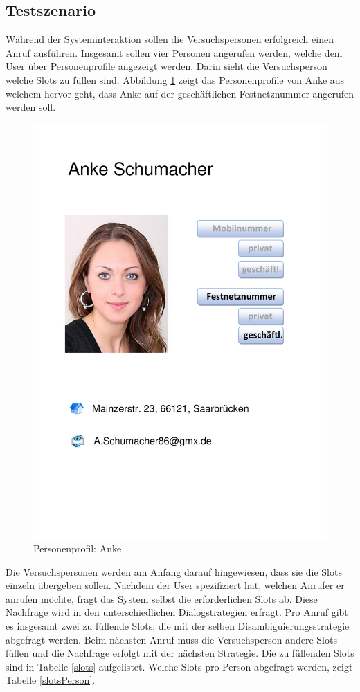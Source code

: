 \documentclass[12pt,a4paper]{scrartcl}
\begin{document}
\subsection{Testszenario}
\label{testszenario1}
Während der Systeminteraktion sollen die Versuchspersonen erfolgreich einen Anruf ausführen. Insgesamt sollen vier Personen angerufen werden, welche dem User über Personenprofile angezeigt werden.  Darin sieht die Versuchsperson welche Slots zu füllen sind. Abbildung \ref{anke} zeigt das Personenprofile von Anke aus welchem hervor geht, dass Anke auf der geschäftlichen Festnetznummer angerufen werden soll. 
\begin{figure}[htbp]
\begin{center}
\includegraphics[width=12cm]{Anke.pdf}
\caption{Personenprofil: Anke}
\label{anke}
\end{center}
\end{figure}
Die Versuchspersonen werden am Anfang darauf hingewiesen, dass sie die Slots einzeln übergeben sollen. Nachdem der User spezifiziert hat, welchen Anrufer er anrufen möchte, fragt das System selbst die erforderlichen Slots ab. Diese Nachfrage wird in den unterschiedlichen Dialogstrategien erfragt. Pro Anruf gibt es insgesamt zwei zu füllende Slots, die mit der selben Disambiguierungsstrategie abgefragt werden. Beim nächsten Anruf muss die Versuchsperson andere Slots füllen und die Nachfrage erfolgt mit der nächsten Strategie. 
Die zu füllenden Slots sind in Tabelle \ref{slots} aufgelistet. Welche Slots pro Person abgefragt werden, zeigt Tabelle \ref{slotsPerson}.
\end{document}

